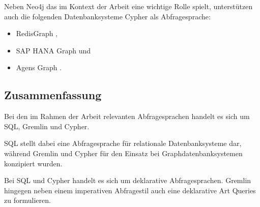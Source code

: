 Neben Neo4j das im Kontext der Arbeit eine wichtige Rolle spielt, unterstützen auch die folgenden Datenbanksysteme Cypher als Abfragesprache:
\begin{itemize}
    \item RedisGraph \cite{redisgraph_2021},
    \item SAP HANA Graph \cite{opencypher_2021} und
    \item Agens Graph \cite{opencypher_2021}.
\end{itemize}

\subsection{Zusammenfassung}
Bei den im Rahmen der Arbeit relevanten Abfragesprachen handelt es sich um SQL, Gremlin und Cypher. 

SQL stellt dabei eine Abfragesprache für relationale Datenbanksysteme dar, während Gremlin und Cypher für den Einsatz bei Graphdatenbanksystemen konzipiert wurden. 

Bei SQL und Cypher handelt es sich um deklarative Abfragesprachen. Gremlin hingegen neben einem imperativen Abfragestil auch eine deklarative Art Queries zu formulieren. 